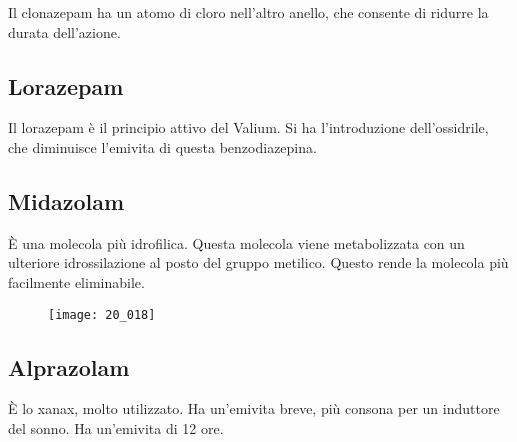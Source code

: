 Il clonazepam ha un atomo di cloro nell'altro anello, che consente di
ridurre la durata dell'azione.

\subsection{Lorazepam}


Il lorazepam è il principio attivo del Valium. Si ha l'introduzione
dell'ossidrile, che diminuisce l'emivita di questa benzodiazepina.

\subsection{Midazolam}


È una molecola più idrofilica. Questa molecola viene metabolizzata con
un ulteriore idrossilazione al posto del gruppo metilico. Questo rende
la molecola più facilmente eliminabile.

\begin{figure}[H]
    \centering
    \texttt{[image: 20\_018]}
\end{figure}

\subsection{Alprazolam}


È lo xanax, molto utilizzato. Ha un'emivita breve, più consona per un
induttore del sonno. Ha un'emivita di 12 ore.
